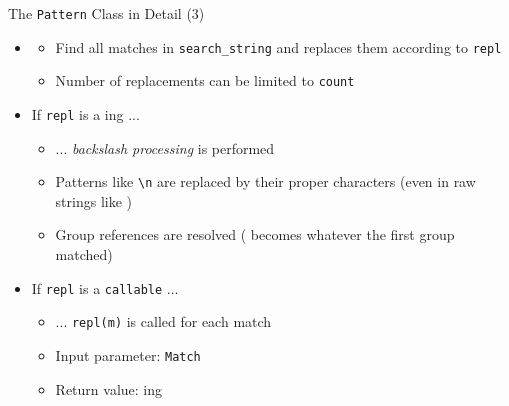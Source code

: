 \begin{frame}{The \texttt{Pattern} Class in Detail (3)}
%
\begin{itemize}
\item {}
	\begin{itemize}
	\item Find all matches in \texttt{search\_string} and replaces them according to \texttt{repl}
	\item Number of replacements can be limited to \texttt{count}
	\end{itemize}
\pause
\item If \texttt{repl} is a ing ...
	\begin{itemize}
	\item ... \emph{backslash processing} is performed
	\item Patterns like \texttt{\textbackslash n} are replaced by their proper characters (even in raw strings like )
	\item Group references are resolved ( becomes whatever the first group matched)
	\end{itemize}
\pause
\item If \texttt{repl} is a \texttt{callable} ...
	\begin{itemize}
	\item ... \texttt{repl(m)} is called for each match
	\item Input parameter: \texttt{Match}
	\item Return value: ing
	\end{itemize}
\end{itemize}
%
\end{frame}


